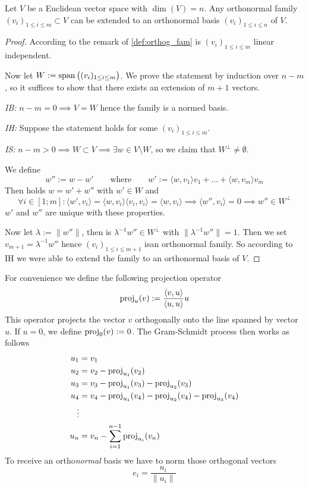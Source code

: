 \begin{proposition}\label{pro:gram-schmidt}
   Let \(V\) be a Euclidean vector space with \(\dim(V) = n\).
   Any orthonormal family \((v_i)_{1 \leq i \leq m} \subset V\) can be extended to an orthonormal basis \((v_i)_{1 \leq i \leq n}\) of \(V\).
\end{proposition}
\begin{proof}
   According to the remark of \cref{def:orthog_fam} is \((v_i)_{1 \leq i \leq m}\) linear independent.

   Now let \(W := \operatorname{span}\big((v_i)_{1 \leq i \leq m}\big)\).
   We prove the statement by induction over \(n-m\), so it suffices to show that there exists an extension of \(m+1\) vectors.

   \textit{IB:} \(n - m = 0 \implies V = W\) hence the family is a normed basis.

   \textit{IH:} Suppose the statement holds for some \((v_i)_{1 \leq i \leq m}\).

   \textit{IS:} \(n - m > 0 \implies W \subset V \implies \exists w \in V\setminus W\), so we claim that \(W^\perp \neq \emptyset\).

   We define
   \[w'' := w - w' \qquad\text{where}\qquad w' := \langle w, v_1 \rangle v_1 + \ldots + \langle w, v_m \rangle v_m\]
   Then holds \(w = w' + w''\) with \(w' \in W\) and
   \[\forall i \in [1; m]: \langle w', v_i \rangle = \langle w, v_i\rangle \langle v_i, v_i \rangle = \langle w, v_i \rangle \implies \langle w'', v_i \rangle = 0 \implies w'' \in W^\perp\]
   \(w'\) and \(w''\) are unique with these properties.

   Now let \(\lambda := \|w''\|\), then is \(\lambda^{-1} w'' \in W^\perp\) with \(\|\lambda^{-1}w''\| = 1\).
   Then we set \(v_{m+1} = \lambda^{-1}w''\) hence \((v_i)_{1 \leq i \leq m+1}\) isan orthonormal family.
   So according to IH we were able to extend the family to an orthonormal basis of \(V\).
\end{proof}
\begin{example}
   For convenience we define the following projection operator
   \[\operatorname{proj}_u(v) := \frac{\langle v, u\rangle}{\langle u, u\rangle} u\]
   This operator projects the vector \(v\) orthogonally onto the line spanned by vector \(u\).
   If \(u = 0\), we define \(\operatorname{proj}_0(v) := 0\).
   The Gram-Schmidt process then works as follows
   \begin{equation*}
      \begin{split}
         u_1 & = v_1\\
         u_2 & = v_2 - \operatorname{proj}_{u_1}(v_2)\\
         u_3 & = v_3 - \operatorname{proj}_{u_1}(v_3) - \operatorname{proj}_{u_2}(v_3)\\
         u_4 & = v_4 - \operatorname{proj}_{u_1}(v_4) - \operatorname{proj}_{u_2}(v_4) - \operatorname{proj}_{u_3}(v_4)\\
             \vdots\\
         u_n & = v_n - \sum_{i=1}^{n-1} \operatorname{proj}_{u_i}(v_n)
      \end{split}
   \end{equation*}
   To receive an ortho\emph{normal} basis we have to norm those orthogonal vectors
   \[e_i = \frac{u_i}{\|u_i\|}\]
\end{example}
